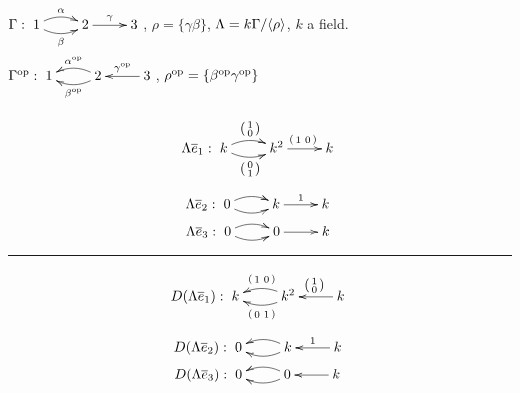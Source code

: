 
\begin{exam}
$\G: \xymatrix{
1 \ar@/^0.5pc/[r]^\alpha \ar@/_0.5pc/[r]_\beta & 2 \ar[r]^\gamma & 3
}$, $\rho = \{ \gamma\beta \}$, $\Lambda = k\Gamma/\langle \rho \rangle$, $k$ a field.\\
$\G^{\op}: \xymatrix{
1 \ar@{<-}@/^0.5pc/[r]^{\alpha^{\op}} \ar@{<-}@/_0.5pc/[r]_{\beta^{\op}} & 2 \ar@{<-}[r]^{\gamma^{\op}} & 3
}$, $\rho^{{\operatorname{op}\nolimits}} = \{ \beta^{{\operatorname{op}\nolimits}}\gamma^{{\operatorname{op}\nolimits}} \}$

\begin{minipage}{0.5\textwidth}
\[\Lambda\overline{e}_1 : \xymatrix{
k \ar@/^0.5pc/[r]^{\left(\begin{smallmatrix} 1\\0 \end{smallmatrix}\right)} \ar@/_0.5pc/[r]_{\left(\begin{smallmatrix} 0\\1 \end{smallmatrix}\right)} & k^2 \ar[r]^{\left(\begin{smallmatrix} 1 & 0 \end{smallmatrix}\right)} & k
}\]
\vspace*{4pt}
\[
\Lambda\overline{e}_2 : \xymatrix{
0 \ar@/^0.5pc/[r]\ar@/_0.5pc/[r] & k \ar[r]^1 & k
}\]
\vspace*{8pt}
\[
\Lambda\overline{e}_3 : \xymatrix{
0 \ar@/^0.5pc/[r]\ar@/_0.5pc/[r] & 0 \ar[r] & k
}\]
\end{minipage}
\rule[-50pt]{1.5pt}{100pt}
\begin{minipage}{0.5\textwidth}
\[D(\Lambda\overline{e}_1) : \xymatrix{
k \ar@{<-}@/^0.5pc/[r]^{\left(\begin{smallmatrix} 1 & 0 \end{smallmatrix}\right)}
\ar@{<-}@/_0.5pc/[r]_{\left(\begin{smallmatrix} 0 &1 \end{smallmatrix}\right)} &
k^2 \ar@{<-}[r]^{\left(\begin{smallmatrix} 1 \\ 0 \end{smallmatrix}\right)} & k 
}\]
\vspace*{4pt}
\[
D(\Lambda\overline{e}_2) : \xymatrix{
0 \ar@{<-}@/^0.5pc/[r]\ar@{<-}@/_0.5pc/[r] & k \ar@{<-}[r]^1 & k
}\]
\vspace*{8pt}
\[
D(\Lambda\overline{e}_3) : \xymatrix{
0 \ar@{<-}@/^0.5pc/[r]\ar@{<-}@/_0.5pc/[r] & 0 \ar@{<-}[r] & k
}\]
\end{minipage}
\end{exam}

